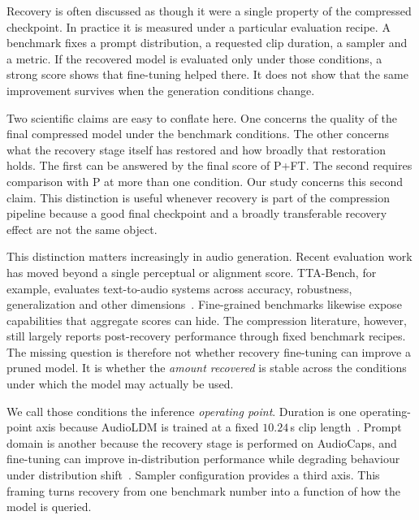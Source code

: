 \documentclass{article}
\newcommand{\PFT}{P{+}FT}
\begin{document}
Recovery is often discussed as though it were a single property of the compressed checkpoint. In practice it is measured under a particular evaluation recipe. A benchmark fixes a prompt distribution, a requested clip duration, a sampler and a metric. If the recovered model is evaluated only under those conditions, a strong score shows that fine-tuning helped there. It does not show that the same improvement survives when the generation conditions change.

Two scientific claims are easy to conflate here. One concerns the quality of the final compressed model under the benchmark conditions. The other concerns what the recovery stage itself has restored and how broadly that restoration holds. The first can be answered by the final score of \PFT{}. The second requires comparison with P at more than one condition. Our study concerns this second claim. This distinction is useful whenever recovery is part of the compression pipeline because a good final checkpoint and a broadly transferable recovery effect are not the same object.

This distinction matters increasingly in audio generation. Recent evaluation work has moved beyond a single perceptual or alignment score. TTA-Bench, for example, evaluates text-to-audio systems across accuracy, robustness, generalization and other dimensions~\cite{wang2026ttabench}. Fine-grained benchmarks likewise expose capabilities that aggregate scores can hide. The compression literature, however, still largely reports post-recovery performance through fixed benchmark recipes. The missing question is therefore not whether recovery fine-tuning can improve a pruned model. It is whether the \emph{amount recovered} is stable across the conditions under which the model may actually be used.

We call those conditions the inference \emph{operating point}. Duration is one operating-point axis because AudioLDM is trained at a fixed $10.24$\,s clip length~\cite{liu2023audioldm,liu2024audioldm2}. Prompt domain is another because the recovery stage is performed on AudioCaps, and fine-tuning can improve in-distribution performance while degrading behaviour under distribution shift~\cite{kumar2022finetuning}. Sampler configuration provides a third axis. This framing turns recovery from one benchmark number into a function of how the model is queried.
\end{document}
